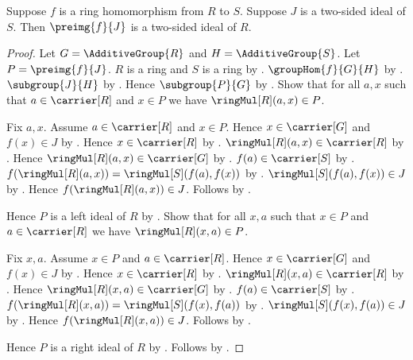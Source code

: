 \begin{theorem}\label{ring_hom_two_sided_ideal_preimage}
    Suppose $f$ is a ring homomorphism from $R$ to $S$.
    Suppose $J$ is a two-sided ideal of $S$.
    Then $\preimg{f}{J}$ is a two-sided ideal of $R$.
\end{theorem}
\begin{proof}
    Let $G=\AdditiveGroup{R}$ and $H=\AdditiveGroup{S}$.
    Let $P=\preimg{f}{J}$.
    $R$ is a ring and $S$ is a ring by
        .
    $\groupHom{f}{G}{H}$ by
        .
    $\subgroup{J}{H}$ by
        .
    Hence $\subgroup{P}{G}$ by
        .
    Show that for all $a,x$ such that $a\in\carrier[R]$ and
        $x\in P$ we have $\ringMul[R](a,x)\in P$.
    \begin{subproof}
        Fix $a,x$.
        Assume $a\in\carrier[R]$ and $x\in P$.
        Hence $x\in\carrier[G]$ and $f(x)\in J$ by
            .
        Hence $x\in\carrier[R]$ by .
        $\ringMul[R](a,x)\in\carrier[R]$ by .
        Hence $\ringMul[R](a,x)\in\carrier[G]$ by
            .
        $f(a)\in\carrier[S]$ by .
        $f(\ringMul[R](a,x))=\ringMul[S](f(a),f(x))$ by
            .
        $\ringMul[S](f(a),f(x))\in J$ by
            .
        Hence $f(\ringMul[R](a,x))\in J$.
        Follows by .
    \end{subproof}
    Hence $P$ is a left ideal of $R$ by
        .
    Show that for all $x,a$ such that $x\in P$ and
        $a\in\carrier[R]$ we have $\ringMul[R](x,a)\in P$.
    \begin{subproof}
        Fix $x,a$.
        Assume $x\in P$ and $a\in\carrier[R]$.
        Hence $x\in\carrier[G]$ and $f(x)\in J$ by
            .
        Hence $x\in\carrier[R]$ by .
        $\ringMul[R](x,a)\in\carrier[R]$ by .
        Hence $\ringMul[R](x,a)\in\carrier[G]$ by
            .
        $f(a)\in\carrier[S]$ by .
        $f(\ringMul[R](x,a))=\ringMul[S](f(x),f(a))$ by
            .
        $\ringMul[S](f(x),f(a))\in J$ by
            .
        Hence $f(\ringMul[R](x,a))\in J$.
        Follows by .
    \end{subproof}
    Hence $P$ is a right ideal of $R$ by
        .
    Follows by .
\end{proof}

